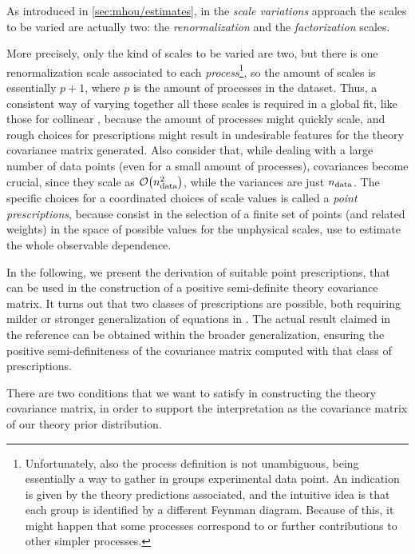 
As introduced in \cref{sec:mhou/estimates}, in the \textit{scale variations}
approach the scales to be varied are actually two: the \textit{renormalization}
and the \textit{factorization} scales.

More precisely, only the kind of scales to be varied are two, but there is one
renormalization scale associated to each \textit{process}\footnote{
  Unfortunately, also the process definition is not unambiguous, being
  essentially a way to gather in groups experimental data point.
  An indication is given by the theory predictions associated, and the
  intuitive idea is that each group is identified by a different \lo Feynman
  diagram.
  Because of this, it might happen that some processes correspond to \nlo or
  further contributions to other simpler processes.
}, so the amount of scales is essentially $p + 1$, where $p$ is the amount of
processes in the dataset.
Thus, a consistent way of varying together all these scales is required in a
global \qcd fit, like those for collinear \pdfs, because the amount of
processes might quickly scale, and rough choices for prescriptions might result
in undesirable features for the theory covariance matrix generated.
Also consider that, while dealing with a large number of data points (even for
a small amount of processes), covariances become crucial, since they scale as
$\order{\nd^2}$, while the variances are just $n_{\text{data}}$.
The specific choices for a coordinated choices of scale values is called a
\textit{point prescriptions}, because consist in the selection of a finite set
of points (and related weights) in the space of possible values for the
unphysical scales, use to estimate the whole observable dependence.

In the following, we present the derivation of suitable point prescriptions,
that can be used in the construction of a positive semi-definite theory
covariance matrix.
It turns out that two classes of prescriptions are possible, both requiring
milder or stronger generalization of equations in \cite{NNPDF:2019ubu}.
The actual result claimed in the reference can be obtained within the broader
generalization, ensuring the positive semi-definiteness of the covariance
matrix computed with that class of prescriptions.

There are two conditions that we want to satisfy in constructing the theory
covariance matrix, in order to support the interpretation as the covariance
matrix of our theory prior distribution.

